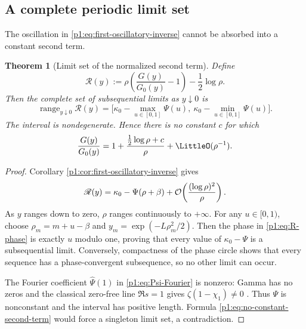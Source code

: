 \documentclass[11pt,oneside]{article}
\numberwithin{equation}{section}
\newtheorem{theorem}{Theorem}[section]
\theoremstyle{definition}
\theoremstyle{remark}
\newcommand{\range}{\operatorname{range}}
\begin{document}
\subsection{A complete periodic limit set}

The oscillation in \eqref{p1:eq:first-oscillatory-inverse} cannot be absorbed into a
constant second term.

\begin{theorem}[Limit set of the normalized second term]
\label{p1:thm:inverse-limit-set}
Define
\begin{equation}
 \mathscr R(y):=
 \rho\left(\frac{G(y)}{G_0(y)}-1\right)-\frac12\log\rho.
 \label{p1:eq:R-limit-set}
\end{equation}
Then the complete set of subsequential limits as $y\downarrow0$ is
\begin{equation}
 \boxed{
 \range_{y\downarrow0}\mathscr R(y)
 =\bigl[\kappa_0-\max_{u\in[0,1]}\Psi(u),
         \ \kappa_0-\min_{u\in[0,1]}\Psi(u)\bigr].}
 \label{p1:eq:inverse-limit-interval}
\end{equation}
The interval is nondegenerate.  Hence there is no constant $c$ for which
\begin{equation}
 \frac{G(y)}{G_0(y)}
 =1+\frac{\tfrac12\log\rho+c}{\rho}+\LittleO(\rho^{-1}).
 \label{p1:eq:no-constant-second-term}
\end{equation}
\end{theorem}

\begin{proof}
Corollary \ref{p1:cor:first-oscillatory-inverse} gives
\begin{equation}
 \mathscr R(y)=\kappa_0-\Psi(\rho+\beta)
 +\mathcal O\!\left(\frac{(\log\rho)^2}{\rho}\right).
 \label{p1:eq:R-phase}
\end{equation}
As $y$ ranges down to zero, $\rho$ ranges continuously to $+\infty$.  For any
$u\in[0,1)$, choose $\rho_m=m+u-\beta$ and
$y_m=\exp(-L\rho_m^2/2)$.  Then the phase in \eqref{p1:eq:R-phase} is exactly
$u$ modulo one, proving that every value of $\kappa_0-\Psi$ is a subsequential
limit.  Conversely, compactness of the phase circle shows that every sequence has a
phase-convergent subsequence, so no other limit can occur.

The Fourier coefficient $\widehat\Psi(1)$ in \eqref{p1:eq:Psi-Fourier} is nonzero:
Gamma has no zeros and the classical zero-free line $\Re s=1$ gives
$\zeta(1-\chi_1)\ne0$ \cite{p1:TitchmarshZeta}.  Thus $\Psi$ is nonconstant and the interval has positive
length.  Formula \eqref{p1:eq:no-constant-second-term} would force a singleton limit set,
a contradiction.
\end{proof}
\end{document}
